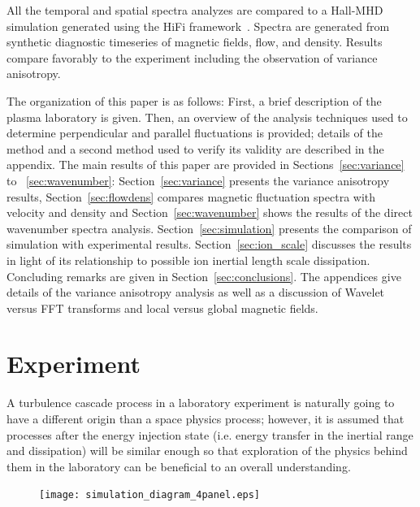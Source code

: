 \documentclass[aip,prl,amsmath,amssymb,reprint,superscriptaddress]{revtex4-1} %
\begin{document}
All the temporal and spatial spectra analyzes are compared to a Hall-MHD simulation generated using the HiFi framework~\cite{schaffner14a}. Spectra are generated from synthetic diagnostic timeseries of magnetic fields, flow, and density. Results compare favorably to the experiment including the observation of variance anisotropy.

The organization of this paper is as follows: First, a brief description of the plasma laboratory is given. Then, an overview of the analysis techniques used to determine perpendicular and parallel fluctuations is provided; details of the method and a second method used to verify its validity are described in the appendix. The main results of this paper are provided in Sections~\ref{sec:variance} to ~\ref{sec:wavenumber}: Section~\ref{sec:variance} presents the variance anisotropy results, Section~\ref{sec:flowdens} compares magnetic fluctuation spectra with velocity and density and Section~\ref{sec:wavenumber} shows the results of the direct wavenumber spectra analysis. Section~\ref{sec:simulation} presents the comparison of simulation with experimental results. Section~\ref{sec:ion_scale} discusses the results in light of its relationship to possible ion inertial length scale dissipation. Concluding remarks are given in Section~\ref{sec:conclusions}. The appendices give details of the variance anisotropy analysis as well as a discussion of Wavelet versus FFT transforms and local versus global magnetic fields.

\section{Experiment}\label{sec:experiment}

A turbulence cascade process in a laboratory experiment is naturally going to have a different origin than a space physics process; however, it is assumed that processes after the energy injection state (i.e. energy transfer in the inertial range and dissipation) will be similar enough so that exploration of the physics behind them in the laboratory can be beneficial to an overall understanding.

\begin{figure}[!htbp]
\centerline{
\texttt{[image: simulation\_diagram\_4panel.eps]}}
\caption{\label{fig:moviestills}}
\end{figure}
\end{document}
